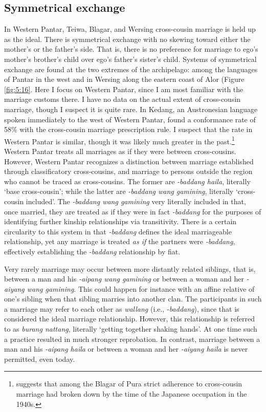 \subsection{Symmetrical exchange}
In Western Pantar, Teiwa, Blagar, and Wersing cross-cousin marriage is held up as the ideal. There is symmetrical exchange with no skewing toward either the mother's or the father's side. That is, there is no preference for marriage to ego's mother's brother's child over ego's father's sister's child. Systems of symmetrical exchange are found at the two extremes of the archipelago: among the languages of Pantar in the west and in Wersing along the eastern coast of Alor (Figure \ref{fig:5:16}. Here I focus on Western Pantar, since I am most familiar with the marriage customs there. I have no data on the actual extent of cross-cousin marriage, though I suspect it is quite rare. In Kedang, an Austronesian language spoken immediately to the west of Western Pantar, \citet[88]{Barnes1980} found a conformance rate of 58\% with the cross-cousin marriage prescription rule. I suspect that the rate in Western Pantar is similar, though it was likely much greater in the past.\footnote{\citet{Steinhauer2010} suggests that among the Blagar of Pura strict adherence to cross-cousin marriage had broken down by the time of the Japanese occupation in the 1940s.} Western Pantar treats all marriages as if they were between cross-cousins. However, Western Pantar recognizes a distinction between marriage established through classificatory cross-cousins, and marriage to persons outside the region who cannot be traced as cross-cousins. The former are \textit{-baddang haila}, literally `base cross-cousin'; while the latter are \textit{-baddang wang gamining}, literally `cross-cousin included'. The \textit{-baddang wang gamining} very literally included in that, once married, they are treated as if they were in fact \textit{-baddang} for the purposes of identifying further kinship relationships via transitivity. There is a certain circularity to this system in that \textit{-baddang} defines the ideal marriageable relationship, yet any marriage is treated \textit{as if} the partners were \textit{-baddang}, effectively establishing the \textit{-baddang} relationship by fiat. 

Very rarely marriage may occur between more distantly related siblings, that is, between a man and his \textit{-aipang wang gamining} or between a woman and her \textit{-aiyang wang gamining}. This could happen for instance with an affine relative of one's sibling when that sibling marries into another clan. The participants in such a marriage may refer to each other as \textit{wallang} (i.e., \textit{-baddang}), since that is considered the ideal marriage relationship. However, this relationship is referred to as \textit{burang nattang}, literally `getting together shaking hands'. At one time such a practice resulted in much stronger reprobation. In contrast, marriage between a man and his \textit{-aipang haila} or between a woman and her \textit{-aiyang haila} is never permitted, even today.

